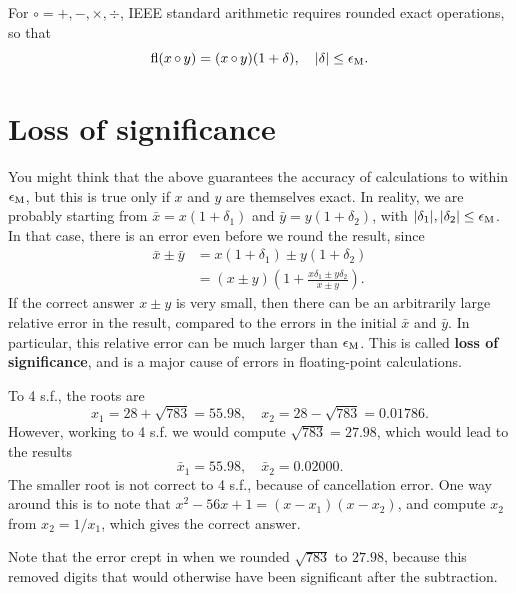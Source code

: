 \documentclass[
  letterpaper,
  DIV=11,
  numbers=noendperiod]{scrreprt}
\begin{document}
For \({\circ} = +,-,\times, \div\), IEEE standard arithmetic requires
rounded exact operations, so that \[
\mathrm{fl}(x {\,\circ\,} y) = (x {\,\circ\,} y)(1+\delta), \quad |\delta|\leq\epsilon_{\rm M}.
\]

\section{Loss of significance}\label{loss-of-significance}

You might think that the above guarantees the accuracy of calculations
to within \(\epsilon_{\rm M}\), but this is true only if \(x\) and \(y\)
are themselves exact. In reality, we are probably starting from
\(\bar{x}=x(1+\delta_1)\) and \(\bar{y}=y(1 + \delta_2)\), with
\(|\delta_1|, |\delta_2| \leq \epsilon_{\rm M}\). In that case, there is
an error even before we round the result, since \[
\begin{aligned}
\bar{x} \pm \bar{y} &= x(1+ \delta_1) \pm y(1 + \delta_2)\\
&= (x\pm y)\left(1 + \frac{x\delta_1 \pm y\delta_2}{x\pm y}\right).
\end{aligned}
\] If the correct answer \(x\pm y\) is very small, then there can be an
arbitrarily large relative error in the result, compared to the errors
in the initial \(\bar{x}\) and \(\bar{y}\). In particular, this relative
error can be much larger than \(\epsilon_{\rm M}\). This is called
\textbf{loss of significance}, and is a major cause of errors in
floating-point calculations.

To 4 s.f., the roots are \[
x_1 = 28 + \sqrt{783} = 55.98, \quad x_2 = 28-\sqrt{783} = 0.01786.
\] However, working to 4 s.f. we would compute \(\sqrt{783} = 27.98\),
which would lead to the results \[
\bar{x}_1 = 55.98, \quad \bar{x}_2 = 0.02000.
\] The smaller root is not correct to 4 s.f., because of cancellation
error. One way around this is to note that
\(x^2 - 56x + 1 = (x-x_1)(x-x_2)\), and compute \(x_2\) from
\(x_2 = 1/x_1\), which gives the correct answer.

\begin{tcolorbox}[enhanced jigsaw, bottomtitle=1mm, title=\textcolor{quarto-callout-note-color}{\faInfo}\hspace{0.5em}{Note}, colback=white, opacityback=0, rightrule=.15mm, bottomrule=.15mm, colbacktitle=quarto-callout-note-color!10!white, colframe=quarto-callout-note-color-frame, arc=.35mm, breakable, coltitle=black, leftrule=.75mm, left=2mm, toptitle=1mm, toprule=.15mm, titlerule=0mm, opacitybacktitle=0.6]

Note that the error crept in when we rounded \(\sqrt{783}\) to
\(27.98\), because this removed digits that would otherwise have been
significant after the subtraction.

\end{tcolorbox}
\end{document}
